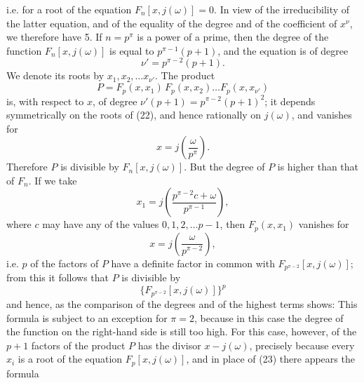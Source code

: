 i.e. for a root of the equation $F_n[x, j(\omega)] = 0$. In view of the irreducibility of the latter equation, and of the equality of the degree and of the coefficient of $x^{\nu}$, we therefore have
5. If $n = p^{\pi}$ is a power of a prime, then the degree of the function $F_n[x, j(\omega)]$ is equal to $p^{\pi-1}(p+1)$, and the equation
is of degree
\[
\nu' = p^{\pi-2}(p+1).
\]
We denote its roots by $x_1, x_2, \dots x_{\nu'}$.
The product
\[
P = F_p(x, x_1)\, F_p(x, x_2) \dots F_p(x, x_{\nu'})
\]
is, with respect to $x$, of degree $\nu'(p+1) = p^{\pi-2}(p+1)^2$; it depends symmetrically on the roots of (22), and hence rationally on $j(\omega)$, and vanishes for
\[
x = j\left(\frac{\omega}{p^{\pi}}\right).
\]
Therefore $P$ is divisible by $F_n[x, j(\omega)]$.
But the degree of $P$ is higher than that of $F_n$. If we take
\[
x_1 = j\left(\frac{p^{\pi-2}c + \omega}{p^{\pi-1}}\right),
\]
where $c$ may have any of the values $0, 1, 2, \dots p-1$, then $F_p(x, x_1)$ vanishes for
\[
x = j\left(\frac{\omega}{p^{\pi-2}}\right),
\]
i.e. $p$ of the factors of $P$ have a definite factor in common with $F_{p^{\pi-2}}[x, j(\omega)]$; from this it follows that $P$ is divisible by
\[
\{F_{p^{\pi-2}}[x, j(\omega)]\}^p
\]
and hence, as the comparison of the degrees and of the highest terms shows:
This formula is subject to an exception for $\pi = 2$, because in this case the degree of the function on the right-hand side is still too high. For this case, however,  of the $p+1$ factors of the product $P$ has the divisor $x - j(\omega)$, precisely because every $x_i$ is a root of the equation $F_p[x, j(\omega)]$, and in place of (23) there appears the formula
